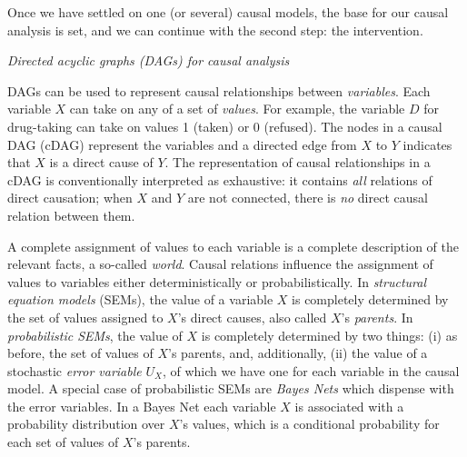 \documentclass[nobib]{tufte-handout}
\begin{document}
Once we have settled on one (or several) causal models, the base for our causal analysis is set, and we can continue with the second step: the intervention.

\begin{InfoBox}
\centering
 \colorbox{mygray}{
    \begin{minipage}{1\textwidth}
    \medskip
    \emph{Directed acyclic graphs (DAGs) for causal analysis}
    \medskip

    DAGs can be used to represent causal relationships between \textit{variables}.
    Each variable $X$ can take on any of a set of \textit{values}.
    For example, the variable $D$ for drug-taking can take on values 1 (taken) or 0 (refused).
    The nodes in a causal DAG (cDAG) represent the variables and a directed edge from $X$ to $Y$ indicates that $X$ is a direct cause of $Y$.
    The representation of causal relationships in a cDAG is conventionally interpreted as exhaustive: it contains \textit{all} relations of direct causation; when $X$ and $Y$ are not connected, there is \textit{no} direct causal relation between them.



    A complete assignment of values to each variable is a complete description of the relevant facts, a so-called \textit{world}.
    Causal relations influence the assignment of values to variables either deterministically or probabilistically.
    In \textit{structural equation models} (SEMs), the value of a variable $X$ is completely determined by the set of values assigned to $X$'s direct causes, also called $X$'s \textit{parents}.
    In \textit{probabilistic SEMs}, the value of $X$ is completely determined by two things: (i) as before, the set of values of $X$'s parents, and, additionally, (ii) the value of a stochastic \emph{error variable} $U_{X}$, of which we have one for each variable in the causal model.
    A special case of probabilistic SEMs are \textit{Bayes Nets} which dispense with the error variables.
    In a Bayes Net each variable $X$ is associated with a probability distribution over $X$'s values, which is a conditional probability for each set of values of $X$'s parents.


\end{minipage}}
\end{InfoBox}
\end{document}
